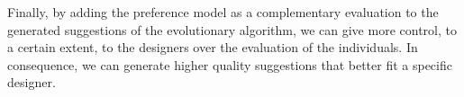Finally, by adding the preference model as a complementary evaluation to the generated suggestions of the evolutionary algorithm, we can give more control, to a certain extent, to the designers over the evaluation of the individuals. In consequence, we can generate higher quality suggestions that better fit a specific designer.%


